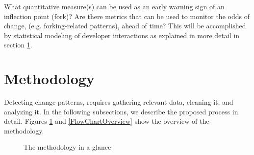 \documentclass[11pt]{report}
\begin{document}
What quantitative measure(s) can be used as an early warning sign of an inflection point (fork)? Are there metrics that can be used to monitor the odds of change, (e.g. forking-related patterns), ahead of time? This will be accomplished by statistical modeling of developer interactions as explained in more detail in section \ref{methodology}.

%
%

\pagebreak

\section{Methodology}
\label{methodology}

Detecting change patterns, requires gathering  relevant data, cleaning it, and analyzing it. In the following subsections, we describe the proposed process in detail. Figures \ref{FlowChart} and \ref{FlowChartOverview} show the overview of the methodology.

\begin{figure}[!ht]
\centering
{}
\caption{The methodology in a glance}
\label{FlowChart}
\end{figure}
\end{document}
